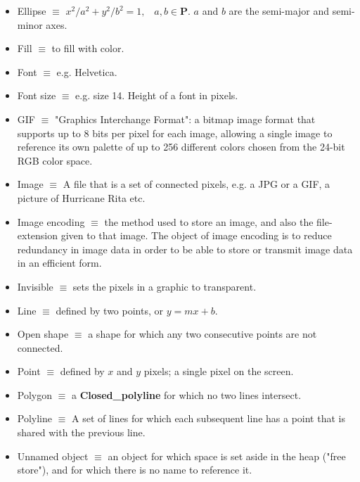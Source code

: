 \documentclass[12pt]{article}
\begin{document}
\begin{itemize}
\item Ellipse $\equiv$ $x^2/a^2+y^2/b^2=1,\;\;\;a,b\in\mathbf{P}$. $a$ and $b$ are the semi-major and semi-minor axes.

\item Fill $\equiv$ to fill with color.

\item Font $\equiv$ e.g. Helvetica.

\item Font size $\equiv$ e.g. size 14. Height of a font in pixels.

\item GIF $\equiv$ "Graphics Interchange Format": a bitmap image format that supports up to 8 bits per pixel for each image, allowing a single image to reference its own palette of up to 256 different colors chosen from the 24-bit RGB color space.

\item Image $\equiv$ A file that is a set of connected pixels, e.g. a JPG or a GIF, a picture of Hurricane Rita etc.

\item Image encoding $\equiv$ the method used to store an image, and also the file-extension given to that image. The object of image encoding is to reduce redundancy in image data in order to be able to store or transmit image data in an efficient form.

\item Invisible $\equiv$ sets the pixels in a graphic to transparent.

\item Line $\equiv$ defined by two points, or $y = mx+b$.

\item Open shape $\equiv$ a shape for which any two consecutive points are not connected.

\item Point $\equiv$ defined by $x$ and $y$ pixels; a single pixel on the screen.

\item Polygon $\equiv$ a \textbf{Closed\_polyline} for which no two lines intersect.

\item Polyline $\equiv$ A set of lines for which each subsequent line has a point that is shared with the previous line.

\item Unnamed object $\equiv$ an object for which space is set aside in the heap ("free store"), and for which there is no name to reference it.


\end{itemize}
\end{document}
